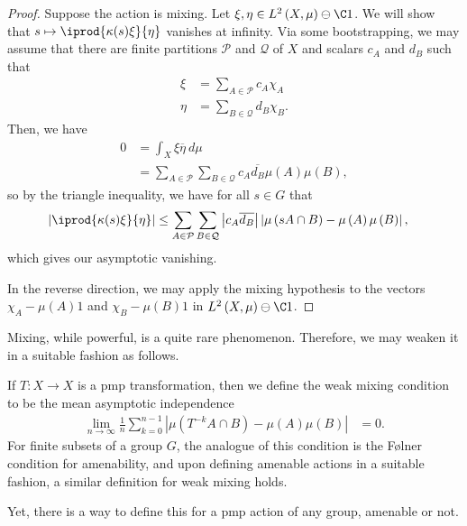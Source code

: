 \documentclass[10pt]{mypackage}
\begin{document}
\begin{proof}
  Suppose the action is mixing. Let $\xi,\eta\in L^2\left( X,\mu \right)\ominus \C 1$. We will show that $s\mapsto \iprod{\kappa(s)\xi}{\eta}$ vanishes at infinity. Via some bootstrapping, we may assume that there are finite partitions $\mathcal{P}$ and $\mathcal{Q}$ of $X$ and scalars $c_A$ and $d_B$ such that 
  \begin{align*}
    \xi &= \sum_{A\in \mathcal{P}} c_A\chi_A\\
    \eta &= \sum_{B\in \mathcal{Q}} d_B \chi_B.
  \end{align*}
  Then, we have
  \begin{align*}
    0 &= \int_{X}^{} \xi \overline{\eta}\:d\mu\\
      &= \sum_{A\in \mathcal{P}}\sum_{B\in \mathcal{Q}} c_A \overline{d_B} \mu\left( A \right)\mu\left( B \right),
  \end{align*}
  so by the triangle inequality, we have for all $s\in G$ that
  \begin{align*}
    \left\vert \iprod{\kappa(s)\xi}{\eta} \right\vert &\leq \sum_{A\in \mathcal{P}}\sum_{B\in \mathcal{Q}} \left\vert c_A \overline{d_B} \right\vert \left\vert \mu\left( sA\cap B \right)-\mu\left( A \right)\mu\left( B \right) \right\vert,
  \end{align*}
  which gives our asymptotic vanishing.

  In the reverse direction, we may apply the mixing hypothesis to the vectors $\chi_A-\mu(A)1$ and $\chi_B-\mu(B)1$ in $L^2\left( X,\mu \right)\ominus \C 1$.
\end{proof}
Mixing, while powerful, is a quite rare phenomenon. Therefore, we may weaken it in a suitable fashion as follows.

If $T\colon X\rightarrow X$ is a pmp transformation, then we define the weak mixing condition to be the mean asymptotic independence
\begin{align*}
  \lim_{n\rightarrow\infty} \frac{1}{n}\sum_{k=0}^{n-1} \left\vert \mu\left( T^{-k}A\cap B \right)-\mu\left( A \right)\mu\left( B \right) \right\vert &= 0.
\end{align*}
For finite subsets of a group $G$, the analogue of this condition is the Følner condition for amenability, and upon defining amenable actions in a suitable fashion, a similar definition for weak mixing holds.

Yet, there is a way to define this for a pmp action of any group, amenable or not.
\end{document}
